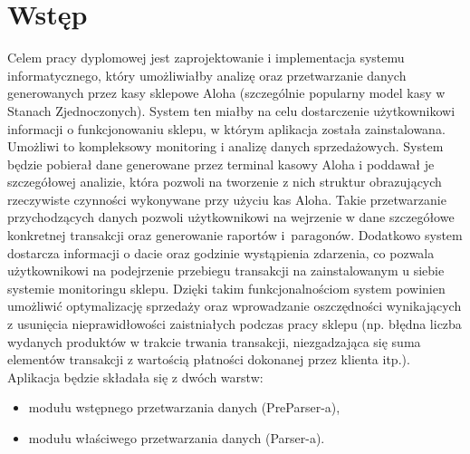 \documentclass[a4paper]{book}
\author{Mateusz Stolecki}
\begin{document}

\cleardoublepage

	



\mainmatter
\chapter{Wstęp}
\label{rozdzial1}
Celem pracy dyplomowej jest zaprojektowanie i implementacja systemu informatycznego, który umożliwiałby analizę oraz przetwarzanie danych generowanych przez kasy sklepowe Aloha (szczególnie popularny model kasy w Stanach Zjednoczonych). System ten miałby na  celu dostarczenie użytkownikowi informacji o funkcjonowaniu sklepu, w którym aplikacja została zainstalowana. Umożliwi to kompleksowy monitoring i analizę danych sprzedażowych. System będzie pobierał dane generowane przez terminal kasowy Aloha i poddawał je szczegółowej analizie, która pozwoli na tworzenie z nich struktur  obrazujących rzeczywiste czynności wykonywane przy użyciu kas Aloha. Takie przetwarzanie przychodzących danych pozwoli użytkownikowi na wejrzenie w dane szczegółowe konkretnej transakcji oraz generowanie raportów i~paragonów. Dodatkowo system dostarcza informacji o dacie oraz godzinie wystąpienia zdarzenia, co pozwala użytkownikowi na podejrzenie przebiegu transakcji na zainstalowanym u siebie systemie monitoringu sklepu. Dzięki takim funkcjonalnościom system powinien umożliwić optymalizację sprzedaży oraz wprowadzanie oszczędności wynikających z usunięcia nieprawidłowości zaistniałych podczas pracy sklepu (np. błędna liczba wydanych produktów w trakcie trwania transakcji, niezgadzająca się suma elementów transakcji z wartością płatności dokonanej przez klienta itp.). Aplikacja będzie składała się z dwóch warstw:
\begin{itemize}
	\item modułu wstępnego przetwarzania danych (PreParser-a),
	\item modułu właściwego przetwarzania danych (Parser-a).
\end{itemize}
\end{document}
